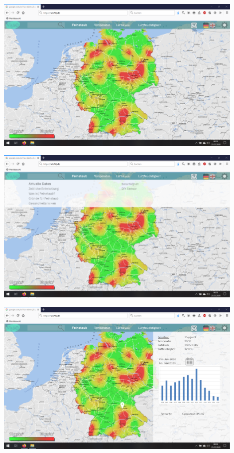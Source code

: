 \begin{center}
	\includegraphics[width=0.9\textwidth]{media/Startseite} 

	\includegraphics[width=0.9\textwidth]{media/Menue} 
	
	\includegraphics[width=0.9\textwidth]{media/Aktuelle-Daten} 


\end{center}
